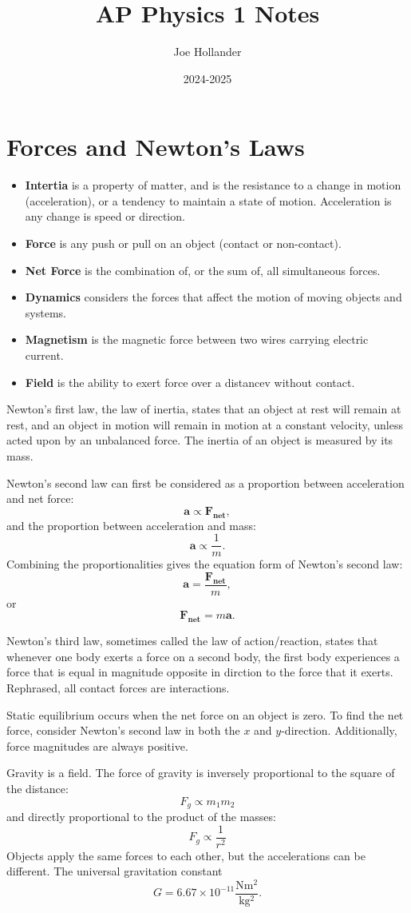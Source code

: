 \documentclass{article}
\title{AP Physics 1 Notes}
\author{Joe Hollander}
\date{2024-2025}
\begin{document}
\maketitle 

\section*{Forces and Newton's Laws}
\begin{itemize} 
    \item \textbf{Intertia} is a property of matter, 
and is the resistance to a change in motion (acceleration),
or a tendency to maintain a state of motion. 
Acceleration is any change is speed or direction.

    \item \textbf{Force} is any push or pull on an object (contact or non-contact).
    \item \textbf{Net Force} is the combination of, or the sum of, all simultaneous forces.
    \item \textbf{Dynamics} considers the forces that affect the motion of moving objects and systems. 
    \item \textbf{Magnetism} is the magnetic force between two wires carrying electric current. 
    \item \textbf{Field} is the ability to exert force over a distancev without contact.
\end{itemize}

Newton's first law, the law of inertia, states that an object at rest will remain at rest, 
and an object in motion will remain in motion at a constant velocity, unless acted upon by an unbalanced force.
The inertia of an object is measured by its mass. 

Newton's second law can first be considered as a proportion between acceleration and net force: 
\[
\mathbf{a \propto F_{net}}, 
\]
and the proportion between acceleration and mass:
\[
\mathbf{a} \propto \frac{1}{m}.
\]
Combining the proportionalities gives the equation form of Newton's second law:
\[
\mathbf{a} = \frac{\mathbf{F_{net}}}{m}, 
\]
or
\[
\mathbf{F_{net}} = m\mathbf{a}.
\]

Newton's third law, sometimes called the law of action/reaction, states that whenever one body exerts a force on a second body, 
the first body experiences a force that is equal in magnitude opposite in dirction to the force that it exerts.
Rephrased, all contact forces are interactions. 

Static equilibrium occurs when the net force on an object is zero.
To find the net force, consider Newton's second law in both the $x$ and $y$-direction. 
Additionally, force magnitudes are always positive. 

Gravity is a field. The force of gravity is inversely proportional to the square of the distance:
\[
F_g \propto m_1m_2 
\]
and directly proportional to the product of the masses:
\[
F_g \propto \frac{1}{r^2}
\]
Objects apply the same forces to each other, but the accelerations can be different.
The universal gravitation constant 
\[
G = 6.67 \times 10^{-11} \frac{\mathrm{Nm^2}}{\mathrm{kg^2}}.
\] 
\end{document}
